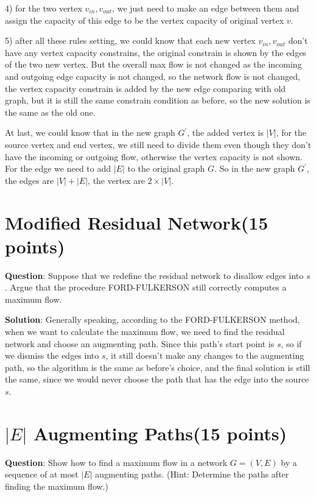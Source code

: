 \documentclass{article}
\begin{document}
4) for the two vertex $v_{in}, v_{out}$, we just need to make an edge between them and assign the capacity of this
edge to be the vertex capacity of original vertex $v$.

5) after all these rules setting, we could know that each new vertex $v_{in}, v_{out}$ don't have any vertex 
capacity constrains, the original constrain is shown by the edges of the two new vertex. But the overall max
flow is not changed as the incoming and outgoing edge capacity is not changed, so the network flow is not changed,
the vertex capacity constrain is added by the new edge comparing with old graph, but it is still the same constrain
condition as before, so the new solution is the same as the old one.

At last, we could know that in the new graph $G^{'}$, the added vertex is $|V|$, for the source vertex and end vertex,
we still need to divide them even though they don't have the incoming or outgoing flow, otherwise the vertex capacity
is not shown. For the edge we need to add $|E|$ to the original graph $G$. So in the new graph $G^{'}$, the edges are \boldmath\underline{$|V|+|E|$}\unboldmath, the vertex are \boldmath\underline{$2\times|V|$}\unboldmath.


\section{Modified Residual Network(15 points)}
\textbf{Question}: Suppose that we redefine the residual network to disallow edges into $s$. Argue that the procedure FORD-FULKERSON still correctly computes a maximum flow.\newline

\textbf{Solution}: Generally speaking, according to the FORD-FULKERSON method, when we want to calculate the maximum flow, we need to find the residual network and choose an augmenting path. Since this path's start point is $s$, so if we dismiss the edges into $s$, it still doesn't make any changes to the augmenting path, so the algorithm is the same as before's choice, and the final solution is still the same, since we would never choose the path that has the edge into the source $s$.


\section{$|E|$  Augmenting Paths(15 points)}
\textbf{Question}: Show how to find a maximum flow in a network $G = (V, E)$ by a sequence of at most $|E|$ augmenting paths. (Hint: Determine the paths after finding the maximum flow.)\newline
\end{document}
